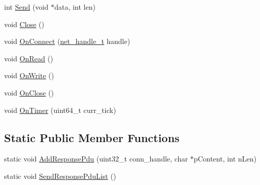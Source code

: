 \begin{DoxyCompactItemize}
int \hyperlink{class_c_http_conn_ab205a0ff06d6d0a629b9c23760bf0177}{Send} (void $\ast$data, int len)
\item 
void \hyperlink{class_c_http_conn_a6e100e44d55155584384ed0fb8e91903}{Close} ()
\item 
void \hyperlink{class_c_http_conn_a1cac21a83a16edc06a8fea0bccc212de}{On\+Connect} (\hyperlink{base_2ostype_8h_a5e1697fa312aa00ac7305460abf166fd}{net\+\_\+handle\+\_\+t} handle)
\item 
void \hyperlink{class_c_http_conn_a1d53fa2c5ef56337b305c036a526b248}{On\+Read} ()
\item 
void \hyperlink{class_c_http_conn_a5472986aa83ff3ee4278b44d4fa107d3}{On\+Write} ()
\item 
void \hyperlink{class_c_http_conn_a41bfb10253014f84ddb95a15485339e3}{On\+Close} ()
\item 
void \hyperlink{class_c_http_conn_ae12aba0480560dbb9c1c59cada86dec7}{On\+Timer} (uint64\+\_\+t curr\+\_\+tick)
\end{DoxyCompactItemize}
\subsection*{Static Public Member Functions}
\begin{DoxyCompactItemize}
\item 
static void \hyperlink{class_c_http_conn_aacccd7b33f51ca113b029b1ab1eba895}{Add\+Response\+Pdu} (uint32\+\_\+t conn\+\_\+handle, char $\ast$p\+Content, int n\+Len)
\item 
static void \hyperlink{class_c_http_conn_a222a879d24e9a2f2716cc02d7483c701}{Send\+Response\+Pdu\+List} ()
\end{DoxyCompactItemize}
